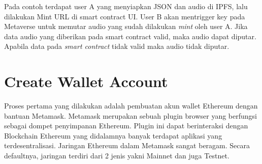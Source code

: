 Pada contoh terdapat user A yang menyiapkan JSON dan audio di IPFS, lalu dilakukan Mint URL di smart contract UI.
User B akan mentrigger key pada Metaverse untuk memutar audio yang sudah dilakukan \emph{mint} oleh user A.
Jika data audio yang diberikan pada smart contract valid, maka audio dapat diputar. Apabila data pada \emph{smart contract} tidak valid
maka audio tidak diputar.

\section{Create Wallet Account}

Proses pertama yang dilakukan adalah pembuatan akun wallet Ethereum dengan bantuan Metamask. Metamask merupakan sebuah plugin browser yang berfungsi sebagai
dompet penyimpanan Ethereum. Plugin ini dapat berinteraksi dengan Blockchain Ethereum yang didalamnya banyak terdapat aplikasi yang terdesentralisasi. Jaringan Ethereum dalam Metamask sangat beragam. Secara defaultnya, jaringan terdiri dari 2 jenis yakni Mainnet dan juga Testnet.

